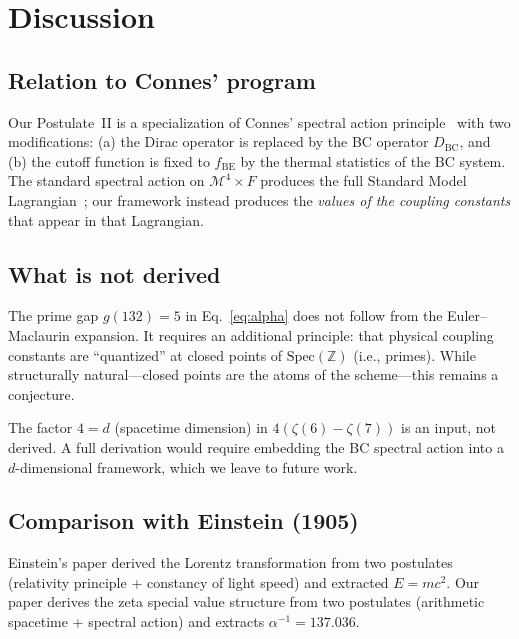 \documentclass[aps,prl,twocolumn,superscriptaddress,nofootinbib]{revtex4-2}
\newcommand{\Spec}{\mathrm{Spec}}
\begin{document}
\section{Discussion}

\subsection{Relation to Connes' program}

Our Postulate~II is a specialization of Connes' spectral action
principle~\cite{Connes1996,ChamseddineConnes1997} with two
modifications: (a) the Dirac operator is replaced by the BC
operator $D_{\mathrm{BC}}$, and (b) the cutoff function is fixed to
$f_{\mathrm{BE}}$ by the thermal statistics of the BC system.  The
standard spectral action on $\mathcal{M}^4\times F$ produces the
full Standard Model Lagrangian~\cite{ConnesMarcolli2008}; our
framework instead produces the \emph{values of the coupling
constants} that appear in that Lagrangian.

\subsection{What is not derived}

The prime gap $g(132)=5$ in Eq.~\eqref{eq:alpha} does not follow
from the Euler--Maclaurin expansion.  It requires an additional
principle: that physical coupling constants are ``quantized'' at
closed points of $\Spec(\mathbb{Z})$ (i.e., primes).  While
structurally natural---closed points are the atoms of the
scheme---this remains a conjecture.

The factor $4=d$ (spacetime dimension) in
$4(\zeta(6)-\zeta(7))$ is an input, not derived.  A full derivation
would require embedding the BC spectral action into a
$d$-dimensional framework, which we leave to future work.

\subsection{Comparison with Einstein (1905)}

Einstein's paper derived the Lorentz transformation from two
postulates (relativity principle + constancy of light speed) and
extracted $E=mc^2$.  Our paper derives the zeta special value
structure from two postulates (arithmetic spacetime + spectral
action) and extracts $\alpha^{-1}=137.036$.
\end{document}
